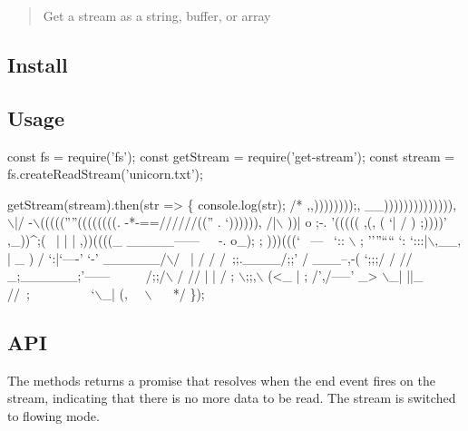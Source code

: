\begin{quote}
Get a stream as a string, buffer, or array \end{quote}


\subsection*{Install}




\subsection*{Usage}


\begin{DoxyCode}
const fs = require('fs');
const getStream = require('get-stream');
const stream = fs.createReadStream('unicorn.txt');

getStream(stream).then(str => \{
  console.log(str);
  /*
                ,,))))))));,
             \_\_)))))))))))))),
  \(\backslash\)|/       -\(\backslash\)(((((''''((((((((.
  -*-==//////((''  .     `)))))),
  /|\(\backslash\)      ))| o    ;-.    '(((((                                  ,(,
           ( `|    /  )    ;))))'                               ,\_))^;(~
              |   |   |   ,))((((\_     \_\_\_\_\_------~~~-.        %
              o\_);   ;    )))(((` ~---~  `::           \(\backslash\)      %
                    ;    ''''````         `:       `:::|\(\backslash\),\_\_,%
                   |   \_                )     /      `:|`----'     `-'
             \_\_\_\_\_\_/\(\backslash\)/~    |                 /        /
           /~;;.\_\_\_\_/;;'  /          \_\_\_--,-(   `;;;/
          / //  \_;\_\_\_\_\_\_;'------~~~~~    /;;/\(\backslash\)    /
         //  | |                        / ;   \(\backslash\);;,\(\backslash\)
        (<\_  | ;                      /',/-----'  \_>
         \(\backslash\)\_| ||\_                     //~;~~~~~~~~~
             `\(\backslash\)\_|                   (,~~
\(\backslash\)
                                      ~~
  */
\});
\end{DoxyCode}


\subsection*{A\+PI}

The methods returns a promise that resolves when the {\ttfamily end} event fires on the stream, indicating that there is no more data to be read. The stream is switched to flowing mode.

